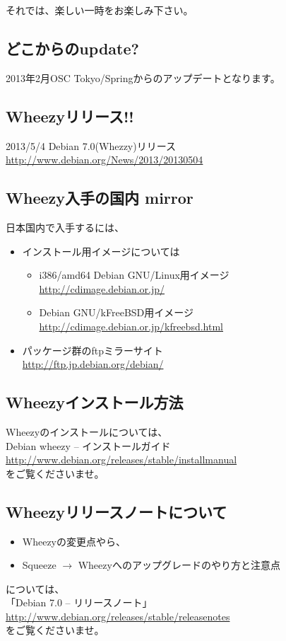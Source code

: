 \documentclass[mingoth,a4paper]{jsarticle}
\begin{document}
 それでは、楽しい一時をお楽しみ下さい。


\subsection{どこからのupdate?}
2013年2月OSC Tokyo/Springからのアップデートとなります。
\subsection{Wheezyリリース!!}
2013/5/4 Debian 7.0(Whezzy)リリース
\url{http://www.debian.org/News/2013/20130504}

\subsection{Wheezy入手の国内 mirror}
日本国内で入手するには、
\begin{itemize}
\item インストール用イメージについては
  \begin{itemize}
  \item {i386/amd64 Debian GNU/Linux用イメージ} \\
    \url{http://cdimage.debian.or.jp/}
  \item {Debian GNU/kFreeBSD用イメージ} \\
    \url{http://cdimage.debian.or.jp/kfreebsd.html}
  \end{itemize}
\item パッケージ群のftpミラーサイト\\
  \url{http://ftp.jp.debian.org/debian/}
\end{itemize}

\subsection{Wheezyインストール方法}

Wheezyのインストールについては、\\
Debian wheezy -- インストールガイド\\
\url{http://www.debian.org/releases/stable/installmanual}\\
をご覧くださいませ。

\subsection{Wheezyリリースノートについて}
\begin{itemize}
\item Wheezyの変更点やら、
\item Squeeze $\rightarrow$ Wheezyへのアップグレードのやり方と注意点
\end{itemize}
については、\\
「Debian 7.0 -- リリースノート」\\
\url{http://www.debian.org/releases/stable/releasenotes}\\
をご覧くださいませ。
\end{document}
